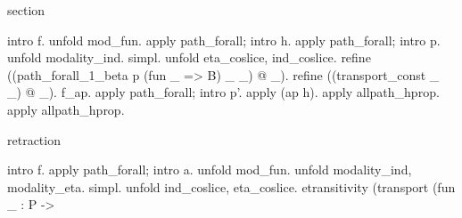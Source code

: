 \begin{coqdoccode}
\begin{coqdoccomment}
\begin{coqdoccomment}
\coqdocindent{0.50em}
section\coqdocindent{0.50em}
\end{coqdoccomment}
\coqdoceol
\coqdocindent{1.00em}
intro\coqdocindent{0.50em}
f.\coqdoceol
\coqdocindent{1.00em}
unfold\coqdocindent{0.50em}
mod\_fun.\coqdoceol
\coqdocindent{1.00em}
apply\coqdocindent{0.50em}
path\_forall;\coqdocindent{0.50em}
intro\coqdocindent{0.50em}
h.\coqdoceol
\coqdocindent{1.00em}
apply\coqdocindent{0.50em}
path\_forall;\coqdocindent{0.50em}
intro\coqdocindent{0.50em}
p.\coqdoceol
\coqdocindent{1.00em}
unfold\coqdocindent{0.50em}
modality\_ind.\coqdocindent{0.50em}
simpl.\coqdoceol
\coqdocindent{1.00em}
unfold\coqdocindent{0.50em}
eta\_coslice,\coqdocindent{0.50em}
ind\_coslice.\coqdoceol
\coqdocindent{1.00em}
refine\coqdocindent{0.50em}
((path\_forall\_1\_beta\coqdocindent{0.50em}
p\coqdocindent{0.50em}
(fun\coqdocindent{0.50em}
\_\coqdocindent{0.50em}
=>\coqdocindent{0.50em}
B)\coqdocindent{0.50em}
\_\coqdocindent{0.50em}
\_)\coqdocindent{0.50em}
@\coqdocindent{0.50em}
\_).\coqdoceol
\coqdocindent{1.00em}
refine\coqdocindent{0.50em}
((transport\_const\coqdocindent{0.50em}
\_\coqdocindent{0.50em}
\_)\coqdocindent{0.50em}
@\coqdocindent{0.50em}
\_).\coqdoceol
\coqdocindent{1.00em}
f\_ap.\coqdocindent{0.50em}
apply\coqdocindent{0.50em}
path\_forall;\coqdocindent{0.50em}
intro\coqdocindent{0.50em}
p'.\coqdocindent{0.50em}
apply\coqdocindent{0.50em}
(ap\coqdocindent{0.50em}
h).\coqdocindent{0.50em}
\coqdoceol
\coqdocindent{1.00em}
apply\coqdocindent{0.50em}
allpath\_hprop.\coqdocindent{0.50em}
apply\coqdocindent{0.50em}
allpath\_hprop.\coqdocindent{0.50em}
\coqdoceol
\coqdoceol
\coqdocindent{1.00em}
\begin{coqdoccomment}
\coqdocindent{0.50em}
retraction\coqdocindent{0.50em}
\end{coqdoccomment}
\coqdoceol
\coqdocindent{1.00em}
intro\coqdocindent{0.50em}
f.\coqdoceol
\coqdocindent{1.00em}
apply\coqdocindent{0.50em}
path\_forall;\coqdocindent{0.50em}
intro\coqdocindent{0.50em}
a.\coqdoceol
\coqdocindent{1.00em}
unfold\coqdocindent{0.50em}
mod\_fun.\coqdoceol
\coqdocindent{1.00em}
unfold\coqdocindent{0.50em}
modality\_ind,\coqdocindent{0.50em}
modality\_eta.\coqdocindent{0.50em}
simpl.\coqdoceol
\coqdocindent{1.00em}
unfold\coqdocindent{0.50em}
ind\_coslice,\coqdocindent{0.50em}
eta\_coslice.\coqdoceol
\coqdocindent{1.00em}
etransitivity\coqdocindent{0.50em}
(transport\coqdocindent{0.50em}
(fun\coqdocindent{0.50em}
\_\coqdocindent{0.50em}
:\coqdocindent{0.50em}
P\coqdocindent{0.50em}
->\coqdocindent{0.50em}

\end{coqdoccomment}
\end{coqdoccode}
